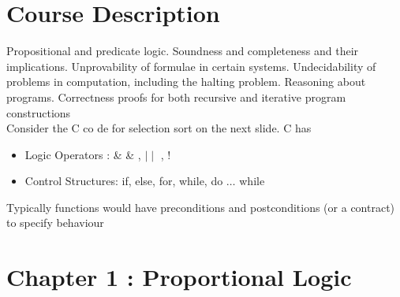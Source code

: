 \documentclass{article}
\newenvironment{ablock}[1]{%
    \tcolorbox[beamer,%
    noparskip,breakable,
    colback=lightcoral,colframe=darkred,%
    colbacklower=tomato!75!lightcoral,%
    title=#1]}%
    {\endtcolorbox}
\begin{document}
\section{Course Description}
\begin{ablock}{As noted on Kevin's Slides} 
Propositional       and       predicate       logic.         Soundness       and       completeness       and       their implications.         Unprovability       of       formulae       in       certain       systems.  Undecidability       of       problems       in       computation,       including       the       halting problem.         Reasoning       about       programs.         Correctness       proofs       for       both recursive       and       iterative       program       constructions \\

Consider       the       C       co de       for       selection       sort       on       the       next       slide.         C       has

\begin{itemize}
\item Logic Operators : \& \& , \(\mid \mid\) , !
\item Control       Structures: if,          else,          for,          while,          do \(\hdots\) while
\end{itemize}

Typically       functions       would       have       preconditions       and       postconditions       (or       a contract)       to       specify       behaviour
\end{ablock}

\section{Chapter 1 : Proportional Logic }
\end{document}
